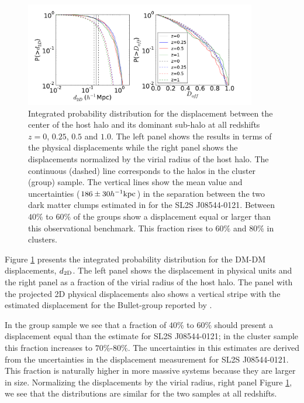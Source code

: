 \documentclass{emulateapj}
\newcommand{\hkpc}{{\ifmmode{h^{-1}{\rm kpc}}\else{$h^{-1}$kpc }\fi}}
\newcommand{\bullg}{SL2S J08544-0121}
\begin{document}
\begin{figure}
\begin{center}
\includegraphics[width=0.9\textwidth]{figure_1.pdf}
\end{center}
\caption{
  Integrated probability distribution for the displacement between the
  center of the host halo and its dominant sub-halo at all redshifts
  $z=0$, $0.25$, $0.5$ and $1.0$. The left panel
  shows the results in terms of the physical displacements while the
  right panel shows the displacements normalized by the virial radius
  of the host halo. The continuous (dashed) line corresponds to the halos in the
  cluster (group) sample.
  The vertical lines show the mean value and uncertainties ($186\pm
  30\hkpc$) in the  separation between the two dark matter clumps
  estimated in \citet{Gastaldello} for the \bullg. Between $40\%$
  to $60\%$ of the groups show a displacement equal or larger than
  this observational benchmark. This fraction rises to $60\%$ and
  $80\%$ in clusters.}
\label{fig:displacement}
\end{figure}

Figure \ref{fig:displacement} presents the integrated
probability distribution for the DM-DM displacements, $d_{\rm 2D}$. The
left panel shows the displacement in physical units and the right
panel as a fraction of the virial radius of the host halo.  The panel
with the projected 2D physical displacements also shows a vertical
stripe with the estimated displacement for the Bullet-group reported
by \cite{Gastaldello}.   

In the group sample we see that a fraction of
$40\%$ to $60\%$  should present a displacement equal than the
estimate for \bullg; in the cluster sample this fraction increases to
$70\%$-$80\%$. The uncertainties in this estimates are derived from
the uncertainties in the displacement measurement for \bullg. This
fraction is naturally higher in more massive systems because they are
larger in size. Normalizing the displacements by the virial radius,
right panel Figure \ref{fig:displacement}, we see that the
distributions are similar for the two samples at all redshifts.
\end{document}
